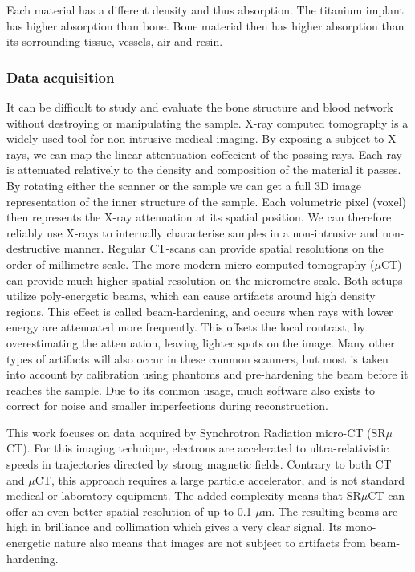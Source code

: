 Each material has a different density and thus absorption. The titanium implant has higher absorption than bone.
Bone material then has higher absorption than its sorrounding tissue, vessels, air and resin.

\subsubsection*{Data acquisition}

It can be difficult to study and evaluate the bone structure and blood network without destroying or
manipulating the sample. X-ray computed tomography is a widely used tool for non-intrusive medical
imaging. By exposing a subject to X-rays, we can map the linear attentuation coffecient of the passing
rays. Each ray is attenuated relatively to the density and composition of the material it passes. By
rotating either the scanner or the sample we can get a full 3D image representation of the inner
structure of the sample. Each volumetric pixel (voxel) then represents the X-ray attenuation at its spatial position. We can therefore reliably use X-rays to internally characterise samples in a non-intrusive and non-destructive manner. Regular CT-scans can provide spatial resolutions on the order of millimetre scale. The more modern micro computed tomography ($\mu$CT) can provide much higher spatial resolution on the micrometre scale. Both setups utilize poly-energetic beams, which can cause artifacts around high density regions. This effect is called beam-hardening, and occurs when rays with lower energy are attenuated more frequently. This offsets the local contrast, by overestimating the attenuation, leaving lighter spots on the image. Many other types of artifacts will also occur in these common scanners, but most is taken into account by calibration using phantoms and pre-hardening the beam before it reaches the sample. Due to its common usage, much software also exists to correct for noise and smaller imperfections during reconstruction.

This work focuses on data acquired by Synchrotron Radiation micro-CT (SR$\mu$CT). For this imaging
technique, electrons are accelerated to ultra-relativistic speeds in trajectories directed by strong
magnetic fields. Contrary to both CT and $\mu$CT, this approach requires a large particle accelerator, and is not standard medical or laboratory equipment. The added complexity means that SR$\mu$CT can offer an even better spatial resolution of up to 0.1 $\mu$m. The resulting beams are high in brilliance and collimation which gives a very clear signal. Its mono-energetic nature also means that images are not subject to artifacts from beam-hardening.

